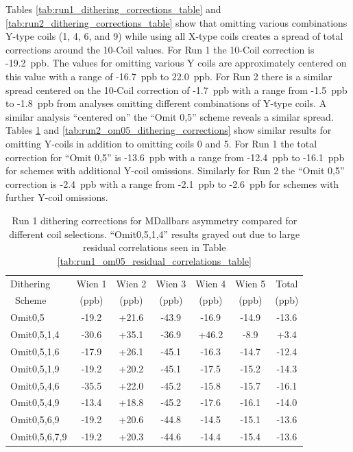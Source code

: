Tables \ref{tab:run1_dithering_corrections_table} and \ref{tab:run2_dithering_corrections_table} show that omitting various combinations Y-type coils (1, 4, 6, and 9) while using all X-type coils creates a spread of total corrections around the 10-Coil values. For Run 1 the 10-Coil correction is -19.2~ppb. The values for omitting various Y coils are approximately centered on this value with a range of -16.7~ppb to  22.0~ppb. For Run 2 there is a similar spread centered on the 10-Coil correction of -1.7~ppb with a range from -1.5~ppb to -1.8~ppb from analyses omitting different combinations of Y-type coils. A similar analysis ``centered on'' the ``Omit 0,5'' scheme reveals a similar spread. Tables \ref{tab:run1_om05_dithering_corrections} and \ref{tab:run2_om05_dithering_corrections} show similar results for omitting Y-coils in addition to omitting coils 0 and 5. For Run 1 the total correction for ``Omit 0,5'' is -13.6~ppb with a range from -12.4~ppb to -16.1~ppb for schemes with additional Y-coil omissions. Similarly for Run 2 the ``Omit 0,5'' correction is -2.4~ppb with a range from -2.1~ppb to -2.6~ppb for schemes with further Y-coil omissions.
\begin{table}[!h]

\caption{\label{tab:run1_om05_dithering_corrections}Run 1 dithering corrections for MDallbars asymmetry compared for different coil selections. ``Omit0,5,1,4'' results grayed out due to large residual correlations seen in Table \ref{tab:run1_om05_residual_correlations_table}}
\begin{center}
\begin{tabular}[h]{|l||c|c|c|c|c||c|}\hline
Dithering& Wien 1& Wien 2& Wien 3& Wien 4& Wien 5& Total\\
~Scheme&(ppb)&(ppb)&(ppb)&(ppb)&(ppb)&(ppb)\\\hline\hline
Omit0,5& -19.2& +21.6& -43.9& -16.9& -14.9& -13.6\\\hline
{\color{Gray}Omit0,5,1,4}&{\color{Gray} -30.6}&{\color{Gray} +35.1}&{\color{Gray} -36.9}&{\color{Gray} +46.2}&{\color{Gray} -8.9}&{\color{Gray} +3.4}\\\hline
Omit0,5,1,6& -17.9& +26.1& -45.1& -16.3& -14.7& -12.4\\\hline
Omit0,5,1,9& -19.2& +20.2& -45.1& -17.5& -15.2& -14.3\\\hline
Omit0,5,4,6& -35.5& +22.0& -45.2& -15.8& -15.7& -16.1\\\hline
Omit0,5,4,9& -13.4& +18.8& -45.2& -17.6& -16.1& -14.0\\\hline
Omit0,5,6,9& -19.2& +20.6& -44.8& -14.5& -15.1& -13.6\\\hline
Omit0,5,6,7,9& -19.2& +20.3& -44.6& -14.4& -15.4& -13.6\\\hline
\end{tabular}
\end{center}
\end{table}
